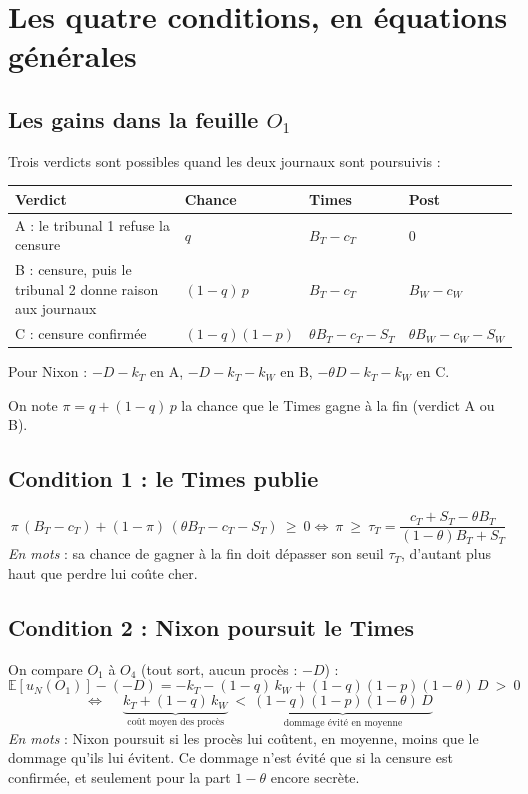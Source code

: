 \documentclass[11pt,a4paper]{article}
\theoremstyle{definition}
\newcommand{\E}{\mathbb{E}}
\newcommand{\T}[1]{\textcolor{nyt}{#1}}
\newcommand{\W}[1]{\textcolor{wp}{#1}}
\begin{document}
\section{Les quatre conditions, en équations générales}

\subsection{Les gains dans la feuille \texorpdfstring{$O_1$}{O1}}
Trois verdicts sont possibles quand les deux journaux sont poursuivis :
\begin{center}
\footnotesize
\begin{tabular}{@{}llll@{}}
\toprule
Verdict & Chance & \T{Times} & \W{Post} \\
\midrule
A : le tribunal 1 refuse la censure & $q$ & $B_T-c_T$ & $0$ \\
B : censure, puis le tribunal 2 donne raison aux journaux & $(1-q)\,p$ & $B_T-c_T$ & $B_W-c_W$ \\
C : censure confirmée & $(1-q)(1-p)$ & $\theta B_T-c_T-S_T$ & $\theta B_W-c_W-S_W$ \\
\bottomrule
\end{tabular}
\end{center}
Pour Nixon : $-D-k_T$ en A, $-D-k_T-k_W$ en B, $-\theta D-k_T-k_W$ en C.

On note $\pi=q+(1-q)\,p$ la chance que le Times gagne à la fin (verdict A ou B).

\subsection{Condition 1 : le Times publie}
\[
\pi\,(B_T-c_T)+(1-\pi)\,(\theta B_T-c_T-S_T)\ \ge\ 0
\iff
\boxed{\ \pi\ \ge\ \tau_T=\frac{c_T+S_T-\theta B_T}{(1-\theta)B_T+S_T}\ }
\]
\textit{En mots} : sa chance de gagner à la fin doit dépasser son seuil $\tau_T$, d'autant plus haut que perdre lui coûte cher.

\subsection{Condition 2 : Nixon poursuit le Times}
On compare $O_1$ à $O_4$ (tout sort, aucun procès : $-D$) :
\[
\E[u_N(O_1)]-(-D)=-k_T-(1-q)\,k_W+(1-q)(1-p)(1-\theta)\,D\ >\ 0
\]
\[
\iff\quad
\boxed{\ \underbrace{k_T+(1-q)\,k_W}_{\text{coût moyen des procès}}\ <\ \underbrace{(1-q)(1-p)(1-\theta)\,D}_{\text{dommage évité en moyenne}}\ }
\]
\textit{En mots} : Nixon poursuit si les procès lui coûtent, en moyenne, moins que le dommage qu'ils lui évitent. Ce dommage n'est évité que si la censure est confirmée, et seulement pour la part $1-\theta$ encore secrète.
\end{document}
